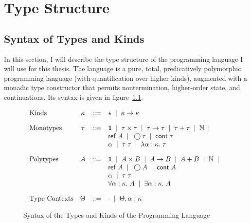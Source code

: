 \chapter{Type Structure}

\section{Syntax of Types and Kinds}

In this section, I will describe the type structure of the 
programming language I will use for this thesis. The language is a
pure, total, predicatively polymorphic programming language (with
quantification over higher kinds), augmented with a monadic type
constructor that permits nontermination, higher-order state, and
continuations. Its syntax is given in figure~\ref{lang-type-syntax}. 


\begin{figure}[h]

\begin{displaymath}
  \begin{array}{lcll}
    \mbox{Kinds} & 
      \kappa & ::= & \star \;\;|\;\; \kappa \to \kappa 
    \\[1em]
    \mbox{Monotypes} & 
      \tau & ::= & 
         \mathbf{1} \;\;|\;\; 
         \tau \times \tau \;\;|\;\; 
         \tau \to \tau \;\;|\;\; 
         \tau + \tau \;\;|\;\;
         \mathbb{N} \;\;|\;\; \\
     &&& \mathsf{ref}\;A \;\;|\;\;
         \bigcirc{\tau} \;\;|\;\; 
         \mathsf{cont}\;{\tau} \\
     &&& \alpha \;\;|\;\;
         \tau\;\tau \;\;|\;\; 
         \lambda \alpha:\kappa.\;\tau 
    \\[1em]
    \mbox{Polytypes} & 
      A & ::= & 
         \mathbf{1} \;\;|\;\; 
         A \times B \;\;|\;\; 
         A \to B \;\;|\;\; 
         A + B \;\;|\;\;
         \mathbb{N} \;\;|\;\;  \\
    &&&  \mathsf{ref}\;A \;\;|\;\;
         \bigcirc{A} \;\;|\;\; 
         \mathsf{cont}\;{A} \\
    &&&  \alpha \;\;|\;\;
         \tau\;\tau \;\;|\;\; \\
    &&&  \forall \alpha:\kappa.\; A \;\;|\;\; 
         \exists \alpha:\kappa.\; A \\[1em]
    \mbox{Type Contexts} & 
      \Theta & ::= & \cdot \;\;|\;\; \Theta, \alpha:\kappa \\
  \end{array}
\end{displaymath}
\caption{Syntax of the Types and Kinds of the Programming Language}
\label{lang-type-syntax}
\end{figure}

